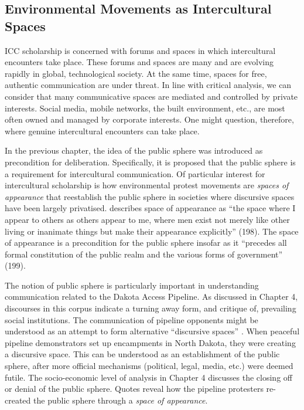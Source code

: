 \subsection{Environmental Movements as Intercultural Spaces}

ICC scholarship is concerned with forums and spaces in which intercultural encounters take place. These forums and spaces are many and are evolving rapidly in global, technological society. At the same time, spaces for free, authentic communication are under threat. In line with critical analysis, we can consider that many communicative spaces are mediated and controlled by private interests. Social media, mobile networks, the built environment, etc., are most often owned and managed by corporate interests. One might question, therefore, where genuine intercultural encounters can take place.

In the previous chapter, the idea of the public sphere was introduced as precondition for deliberation. Specifically, it is proposed that the public sphere is a requirement for intercultural communication. Of particular interest for intercultural scholarship is how environmental protest movements are \textit{spaces of appearance} that reestablish the public sphere in societies where discursive spaces have been largely privatised. \cite*{Arendt1958a} describes space of appearance as ``the space where I appear to others as others appear to me, where men exist not merely like other living or inanimate things but make their appearance explicitly'' (198). The space of appearance is a precondition for the public sphere insofar as it ``precedes all formal constitution of the public realm and the various forms of government'' (199).

The notion of public sphere is particularly important in understanding communication related to the Dakota Access Pipeline. As discussed in Chapter 4, discourses in this corpus indicate a turning away form, and critique of, prevailing social institutions. The communication of pipeline opponents might be understood as an attempt to form alternative ``discursive spaces'' \citep[61]{Hauser1999a}. When peaceful pipeline demonstrators set up encampments in North Dakota, they were creating a discursive space. This can be understood as an establishment of the public sphere, after more official mechanisms (political, legal, media, etc.) were deemed futile. The socio-economic level of analysis in Chapter 4 discusses the closing off or denial of the public sphere. Quotes reveal how the pipeline protesters re-created the public sphere through a \textit{space of appearance}. 

